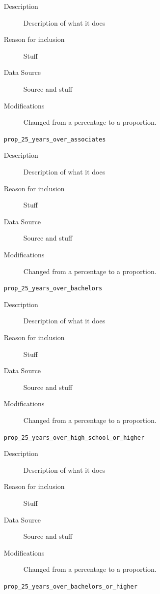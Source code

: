 \documentclass{article}
\begin{document}
\begin{itemize}[label={}, align=left]
          \begin{description}
              \item[Description] Description of what it does
              \item[Reason for inclusion] Stuff
              \item[Data Source] Source and stuff
              \item[Modifications] Changed from a percentage to a proportion.
          \end{description}
    \item[\texttt{prop\_25\_years\_over\_associates}] \
          \begin{description}
              \item[Description] Description of what it does
              \item[Reason for inclusion] Stuff
              \item[Data Source] Source and stuff
              \item[Modifications] Changed from a percentage to a proportion.
          \end{description}
    \item[\texttt{prop\_25\_years\_over\_bachelors}] \
          \begin{description}
              \item[Description] Description of what it does
              \item[Reason for inclusion] Stuff
              \item[Data Source] Source and stuff
              \item[Modifications] Changed from a percentage to a proportion.
          \end{description}
    \item[\texttt{prop\_25\_years\_over\_high\_school\_or\_higher}] \
          \begin{description}
              \item[Description] Description of what it does
              \item[Reason for inclusion] Stuff
              \item[Data Source] Source and stuff
              \item[Modifications] Changed from a percentage to a proportion.
          \end{description}
    \item[\texttt{prop\_25\_years\_over\_bachelors\_or\_higher}] \
          \begin{description}

\end{description}
\end{itemize}
\end{document}

